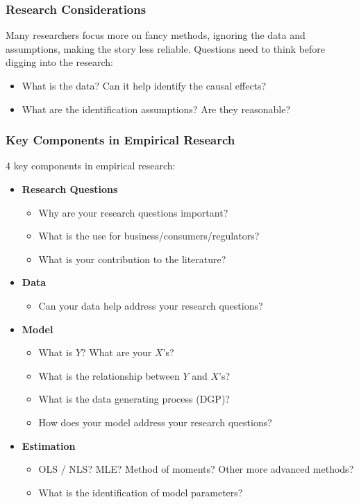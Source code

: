 \documentclass[10pt]{beamer}
\begin{document}
\begin{frame}
\frametitle{Research Considerations}
Many researchers focus more on fancy methods, ignoring the data and assumptions, making the story less reliable. Questions need to think before digging into the research:
\begin{itemize}
    \item What is the data? Can it help identify the causal effects?
    \item What are the identification assumptions? Are they reasonable?
\end{itemize}
\end{frame}

\begin{frame}
\frametitle{Key Components in Empirical Research}
4 key components in empirical research:
\begin{itemize}
    \item \textbf{Research Questions}
    \begin{itemize}
        \item Why are your research questions important?
        \item What is the use for business/consumers/regulators?
        \item What is your contribution to the literature?
    \end{itemize}
    
    \item \textbf{Data}
    \begin{itemize}
        \item Can your data help address your research questions?
    \end{itemize}
    
    \item \textbf{Model}
    \begin{itemize}
        \item What is \(Y\)? What are your \(X\)'s?
        \item What is the relationship between \(Y\) and \(X\)'s?
        \item What is the data generating process (DGP)?
        \item How does your model address your research questions?
    \end{itemize}
    
    \item \textbf{Estimation}
    \begin{itemize}
        \item OLS / NLS? MLE? Method of moments? Other more advanced methods?
        \item What is the identification of model parameters?
    \end{itemize}
\end{itemize}
\end{frame}
\end{document}
